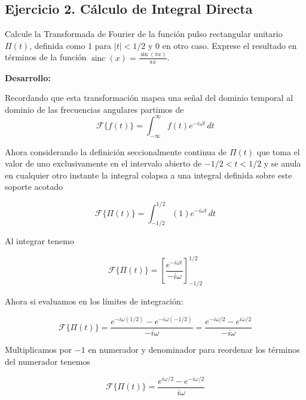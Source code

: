\subsection*{Ejercicio 2. Cálculo de Integral Directa}

Calcule la Transformada de Fourier de la función pulso rectangular unitario $\Pi(t)$, definida como $1$ para $|t| < 1/2$ y $0$ en otro caso. Exprese el resultado en términos de la función $\operatorname{sinc}(x) = \frac{\sin(\pi x)}{\pi x}$.

\vspace{0.5cm}

\textbf{Desarrollo:}

Recordando que esta transformación mapea una señal del dominio temporal al dominio de las frecuencias angulares partimos de
\begin{equation}
    \mathcal{F}\{f(t)\} = \int_{-\infty}^{\infty} f(t) e^{-i\omega t} \, dt
\end{equation}

Ahora considerando la definición seccionalmente continua de $\Pi(t)$ que toma el valor de uno exclusivamente en el intervalo abierto de $-1/2 < t < 1/2$ y se anula en cualquier otro instante la integral colapsa a una integral definida sobre este soporte acotado

\begin{equation}
    \mathcal{F}\{\Pi(t)\} = \int_{-1/2}^{1/2} (1) e^{-i\omega t} \, dt
\end{equation}

Al integrar tenemo

\begin{equation}
    \mathcal{F}\{\Pi(t)\} = \left[ \frac{e^{-i\omega t}}{-i\omega} \right]_{-1/2}^{1/2}
\end{equation}

Ahora si evaluamos en los límites de integración:

\begin{equation}
    \mathcal{F}\{\Pi(t)\} = \frac{e^{-i\omega(1/2)} - e^{-i\omega(-1/2)}}{-i\omega} = \frac{e^{-i\omega/2} - e^{i\omega/2}}{-i\omega}
\end{equation}

Multiplicamos por $-1$ en numerador y denominador para reordenar los términos del numerador tenemos

\begin{equation}
    \mathcal{F}\{\Pi(t)\} = \frac{e^{i\omega/2} - e^{-i\omega/2}}{i\omega}
\end{equation}

